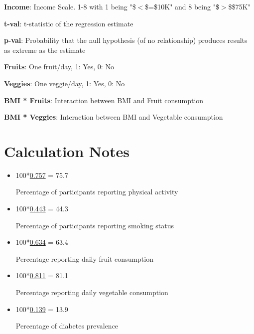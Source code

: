 \documentclass[11pt]{article}
\begin{document}
\begin{codeoutput}
\begin{table}[h]
\begin{threeparttable}
\begin{tablenotes}
\item \textbf{Income}: Income Scale. 1-8 with 1 being "\$$<$\$=\$10K" and 8 being "\$$>$\$\$75K"
\item \textbf{t-val}: t-statistic of the regression estimate
\item \textbf{p-val}: Probability that the null hypothesis (of no relationship) produces results as extreme as the estimate
\item \textbf{Fruits}: One fruit/day, 1: Yes, 0: No
\item \textbf{Veggies}: One veggie/day, 1: Yes, 0: No
\item \textbf{BMI * Fruits}: Interaction between BMI and Fruit consumption
\item \textbf{BMI * Veggies}: Interaction between BMI and Vegetable consumption
\end{tablenotes}
\end{threeparttable}
\end{table}

\end{codeoutput}

\section{Calculation Notes}
\begin{itemize}
\item{100*\hyperlink{A2a}{0.757} = 75.7

Percentage of participants reporting physical activity}
\item{100*\hyperlink{A3a}{0.443} = 44.3

Percentage of participants reporting smoking status}
\item{100*\hyperlink{A4a}{0.634} = 63.4

Percentage reporting daily fruit consumption}
\item{100*\hyperlink{A5a}{0.811} = 81.1

Percentage reporting daily vegetable consumption}
\item{100*\hyperlink{A0a}{0.139} = 13.9

Percentage of diabetes prevalence}
\end{itemize}
\end{document}
